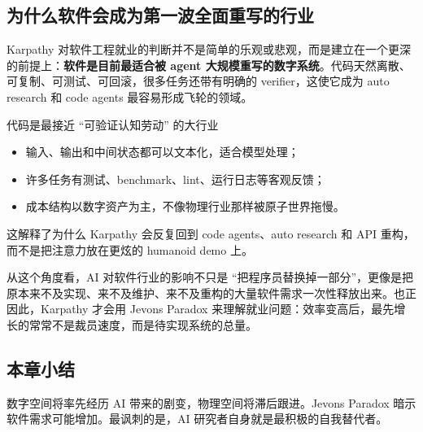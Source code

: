 \subsection{为什么软件会成为第一波全面重写的行业}
Karpathy 对软件工程就业的判断并不是简单的乐观或悲观，而是建立在一个更深的前提上：\textbf{软件是目前最适合被 agent 大规模重写的数字系统}。代码天然离散、可复制、可测试、可回滚，很多任务还带有明确的 verifier，这使它成为 auto research 和 code agents 最容易形成飞轮的领域。

\begin{importantbox}{代码是最接近 ``可验证认知劳动'' 的大行业}
\begin{itemize}
    \item 输入、输出和中间状态都可以文本化，适合模型处理；
    \item 许多任务有测试、benchmark、lint、运行日志等客观反馈；
    \item 成本结构以数字资产为主，不像物理行业那样被原子世界拖慢。
\end{itemize}
这解释了为什么 Karpathy 会反复回到 code agents、auto research 和 API 重构，而不是把注意力放在更炫的 humanoid demo 上。
\end{importantbox}

从这个角度看，AI 对软件行业的影响不只是 ``把程序员替换掉一部分''，更像是把原本来不及实现、来不及维护、来不及重构的大量软件需求一次性释放出来。也正因此，Karpathy 才会用 Jevons Paradox 来理解就业问题：效率变高后，最先增长的常常不是裁员速度，而是待实现系统的总量。

\subsection{本章小结}

数字空间将率先经历 AI 带来的剧变，物理空间将滞后跟进。Jevons Paradox 暗示软件需求可能增加。最讽刺的是，AI 研究者自身就是最积极的自我替代者。


